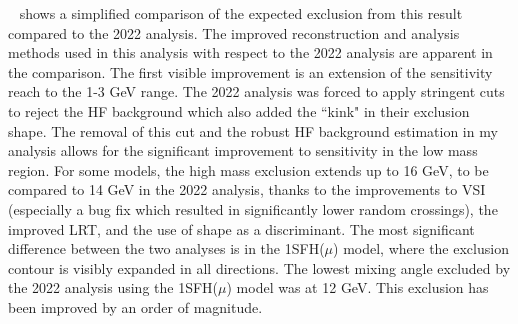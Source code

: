 ~ shows a simplified comparison of the expected exclusion from this result compared to the 2022 analysis. The improved reconstruction and analysis methods used in this analysis with respect to the 2022 analysis are apparent in the comparison. The first visible improvement is an extension of the sensitivity reach to the 1-3 GeV range. The 2022 analysis was forced to apply stringent cuts to reject the HF background which also added the ``kink" in their exclusion shape. The removal of this cut and the robust HF background estimation in my analysis allows for the significant improvement to sensitivity in the low mass region. For some models, the high mass exclusion extends up to 16 GeV, to be compared to 14 GeV in the 2022 analysis, thanks to the improvements to VSI (especially a bug fix which resulted in significantly lower random crossings), the improved LRT, and the use of \mhnl shape as a discriminant. The most significant difference between the two analyses is in the 1SFH($\mu$) model, where the exclusion contour is visibly expanded in all directions. The lowest mixing angle excluded by the 2022 analysis using the 1SFH($\mu$) model was at 12 GeV. This exclusion has been improved by an order of magnitude.